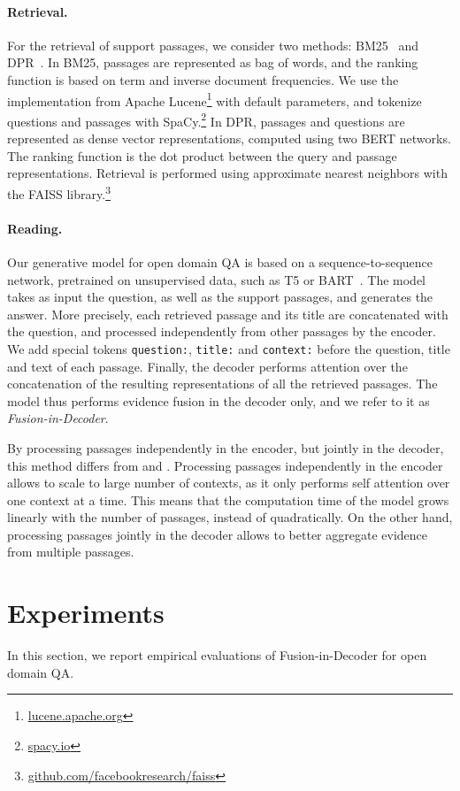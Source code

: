 \documentclass[11pt,a4paper]{article}
\begin{document}
\paragraph{Retrieval.}
For the retrieval of support passages, we consider two methods: BM25~\citep{robertson1995okapi} and DPR~\citep{karpukhin2020dense}.
In BM25, passages are represented as bag of words, and the ranking function is based on term and inverse document frequencies.
We use the implementation from Apache Lucene\footnote{\url{lucene.apache.org}} with default parameters, and tokenize questions and passages with SpaCy.\footnote{\url{spacy.io}}
In DPR, passages and questions are represented as dense vector representations, computed using two BERT networks.
The ranking function is the dot product between the query and passage representations. 
Retrieval is performed using approximate nearest neighbors with the FAISS library.\footnote{\url{github.com/facebookresearch/faiss}}

\paragraph{Reading.}
Our generative model for open domain QA is based on a sequence-to-sequence network, pretrained on unsupervised data, such as T5 or BART~\citep{raffel2019exploring,lewis2019bart}.
The model takes as input the question, as well as the support passages, and generates the answer.
More precisely, each retrieved passage and its title are concatenated with the question, and processed independently from other passages by the encoder.
We add special tokens \texttt{question:}, \texttt{title:} and \texttt{context:} before the question, title and text of each passage.
Finally, the decoder performs attention over the concatenation of the resulting representations of all the retrieved passages.
The model thus performs evidence fusion in the decoder only, and we refer to it as \emph{Fusion-in-Decoder}.

By processing passages independently in the encoder, but jointly in the decoder, this method differs from \citet{min2020ambigqa} and \citet{lewis2020retrieval}.
Processing passages independently in the encoder allows to scale to large number of contexts, as it only performs self attention over one context at a time.
This means that the computation time of the model grows linearly with the number of passages, instead of quadratically.
On the other hand, processing passages jointly in the decoder allows to better aggregate evidence from multiple passages.
 \section{Experiments}
In this section, we report empirical evaluations of Fusion-in-Decoder for open domain QA.
\end{document}
